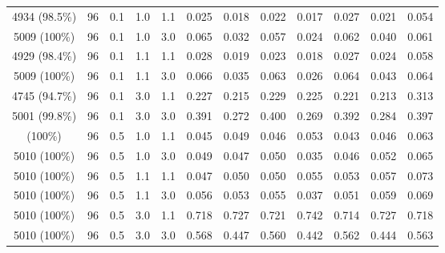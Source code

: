 \begin{longtable}[t]{cccccrrrrrrc}
4934 (98.5\%) & 96 & 0.1 & 1.0 & 1.1 & 0.025 & 0.018 & 0.022 & 0.017 & 0.027 & 0.021 & 0.054\\
5009 (100\%) & 96 & 0.1 & 1.0 & 3.0 & 0.065 & 0.032 & 0.057 & 0.024 & 0.062 & 0.040 & 0.061\\
4929 (98.4\%) & 96 & 0.1 & 1.1 & 1.1 & 0.028 & 0.019 & 0.023 & 0.018 & 0.027 & 0.024 & 0.058\\
5009 (100\%) & 96 & 0.1 & 1.1 & 3.0 & 0.066 & 0.035 & 0.063 & 0.026 & 0.064 & 0.043 & 0.064\\
4745 (94.7\%) & 96 & 0.1 & 3.0 & 1.1 & 0.227 & 0.215 & 0.229 & 0.225 & 0.221 & 0.213 & 0.313\\
5001 (99.8\%) & 96 & 0.1 & 3.0 & 3.0 & 0.391 & 0.272 & 0.400 & 0.269 & 0.392 & 0.284 & 0.397\\
\addlinespace
5010 (100\%) & 96 & 0.5 & 1.0 & 1.1 & 0.045 & 0.049 & 0.046 & 0.053 & 0.043 & 0.046 & 0.063\\
5010 (100\%) & 96 & 0.5 & 1.0 & 3.0 & 0.049 & 0.047 & 0.050 & 0.035 & 0.046 & 0.052 & 0.065\\
5010 (100\%) & 96 & 0.5 & 1.1 & 1.1 & 0.047 & 0.050 & 0.050 & 0.055 & 0.053 & 0.057 & 0.073\\
5010 (100\%) & 96 & 0.5 & 1.1 & 3.0 & 0.056 & 0.053 & 0.055 & 0.037 & 0.051 & 0.059 & 0.069\\
5010 (100\%) & 96 & 0.5 & 3.0 & 1.1 & 0.718 & 0.727 & 0.721 & 0.742 & 0.714 & 0.727 & 0.718\\
5010 (100\%) & 96 & 0.5 & 3.0 & 3.0 & 0.568 & 0.447 & 0.560 & 0.442 & 0.562 & 0.444 & 0.563\\
\bottomrule
\end{longtable}
\endgroup{}
